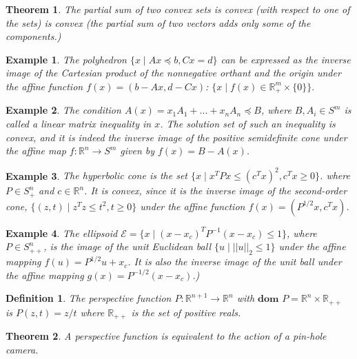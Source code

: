 \documentclass[a4paper]{article}
\newtheorem{mytheorem}{Theorem}
\newtheorem{example}{Example}
\newtheorem{mydef}{Definition}
\numberwithin{mytheorem}{section}
\numberwithin{mydef}{section}
\numberwithin{example}{section}
\begin{document}
\begin{mytheorem} The partial sum of two convex sets is convex (with respect to one of the sets) is convex (the partial sum of two vectors adds only some of the components.)  \end{mytheorem}

\begin{example} The polyhedron $ \{ x \mid Ax \preceq b, Cx = d \}$ can be expressed as the inverse image of the Cartesian product of the nonnegative orthant and the origin under the affine function $f(x) = (b- Ax, d - Cx)$: 
$\{ x \mid f(x) \in \mathbb{R}^{m}_{+} \times \{ 0 \} \}.$ \end{example}

\begin{example} The condition $A(x) = x_{1}A_{1} + ... + x_{n}A_{n} \preceq B$, where $B,A_{i} \in S^{m}$ is called a linear matrix inequality in $x$. The solution set of such an inequality is convex, and it is indeed the inverse image of the positive semidefinite cone under the affine map $f: \mathbb{R}^{n} \rightarrow S^{m}$ given by $f(x) = B - A(x)$. \end{example}

\begin{example} The hyperbolic cone is the set $\{ x \mid x^{T}Px \leq (c^{T}x)^{2}, c^{T}x \geq 0 \}$. where $P \in S^{n}_{+}$ and $c \in \mathbb{R}^{n}$. It is convex, since it is the inverse image of the second-order cone, $\{ (z,t) \mid z^{T}z \leq t^{2}, t \geq 0\}$ under the affine function $f(x) = (P^{1/2}x, c^{T}x)$. \end{example}

\begin{example} The ellipsoid $\mathcal{E} = \{ x \mid (x - x_{c})^{T}P^{-1}(x-x_{c}) \leq 1\}$, where $P \in S^{n}_{++}$, is the image of the unit Euclidean ball $\{ u \mid ||u||_{2} \leq 1 \} $ under the affine mapping $f(u) = P^{1/2}u + x_{c}$. It is also the inverse image of the unit ball under the affine mapping $g(x) = P^{-1/2}(x-x_{c})$.) \end{example}

\begin{mydef} The perspective function $P: \mathbb{R}^{n+1} \rightarrow \mathbb{R}^{n}$ with $\textbf{dom } P = \mathbb{R}^{n} \times \mathbb{R}_{++}$  is $P(z,t) = z/t$ where $\mathbb{R}_{++}$ is the set of positive reals. \end{mydef}

\begin{mytheorem} A perspective function is equivalent to the action of a pin-hole camera. \end{mytheorem}
\end{document}
